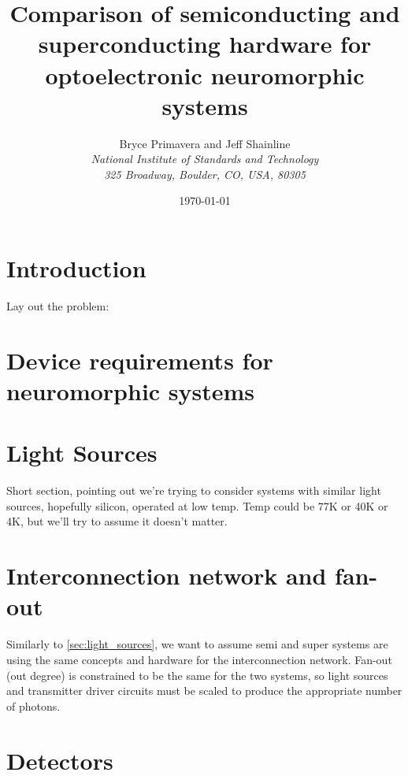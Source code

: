 \documentclass[twocolumn]{article}
\title{Comparison of semiconducting and superconducting hardware for optoelectronic neuromorphic systems}
\author[1]{\Large{Bryce Primavera and Jeff Shainline}
\\
\textit{\large{National Institute of Standards and Technology}}
\\
\vspace{-0.2em}
\textit{\large{325 Broadway, Boulder, CO, USA, 80305}}
\\
}
\date{\today}%
\begin{document}
\twocolumn[
  \begin{@twocolumnfalse}
    \maketitle
    \begin{abstract}

    \vspace{3em}
    \end{abstract}
  \end{@twocolumnfalse}
]


	
\setcounter{tocdepth}{3}
\setcounter{secnumdepth}{4}
\tableofcontents	
	
\section{\label{sec:introduction}Introduction}
Lay out the problem: 

\section{\label{sec:neural_device_requirements}Device requirements for neuromorphic systems}
	
\section{\label{sec:light_sources}Light Sources}
Short section, pointing out we're trying to consider systems with similar light sources, hopefully silicon, operated at low temp. Temp could be 77K or 40K or 4K, but we'll try to assume it doesn't matter. 
	
\section{\label{sec:interconnection}Interconnection network and fan-out}
Similarly to \ref{sec:light_sources}, we want to assume semi and super systems are using the same concepts and hardware for the interconnection network. Fan-out (out degree) is constrained to be the same for the two systems, so light sources and transmitter driver circuits must be scaled to produce the appropriate number of photons.

\section{\label{sec:detectors}Detectors}
\end{document}
